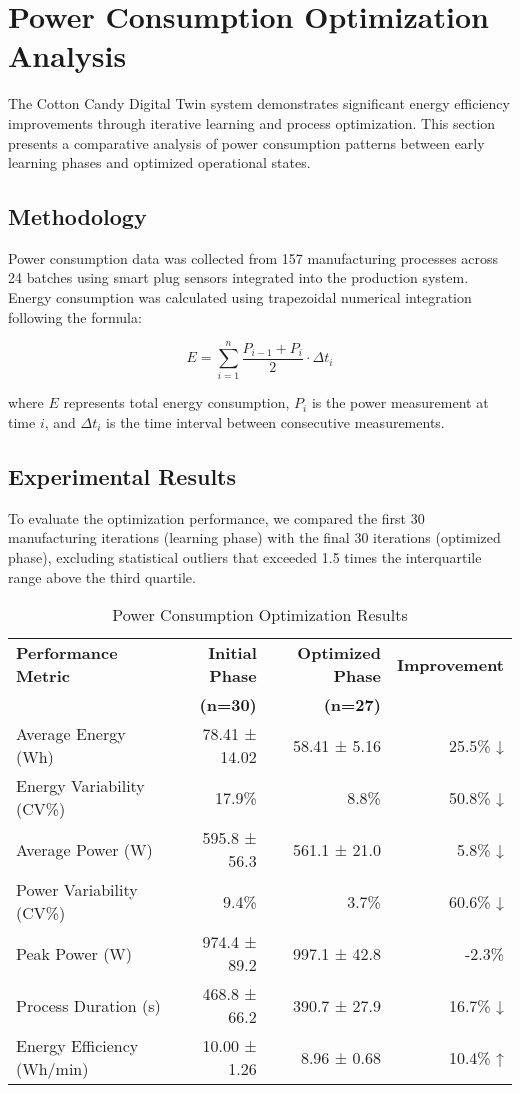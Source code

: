 \section{Power Consumption Optimization Analysis}

The Cotton Candy Digital Twin system demonstrates significant energy efficiency improvements through iterative learning and process optimization. This section presents a comparative analysis of power consumption patterns between early learning phases and optimized operational states.

\subsection{Methodology}

Power consumption data was collected from 157 manufacturing processes across 24 batches using smart plug sensors integrated into the production system. Energy consumption was calculated using trapezoidal numerical integration following the formula:

\begin{equation}
E = \sum_{i=1}^{n} \frac{P_{i-1} + P_i}{2} \cdot \Delta t_i
\end{equation}

where $E$ represents total energy consumption, $P_i$ is the power measurement at time $i$, and $\Delta t_i$ is the time interval between consecutive measurements.

\subsection{Experimental Results}

To evaluate the optimization performance, we compared the first 30 manufacturing iterations (learning phase) with the final 30 iterations (optimized phase), excluding statistical outliers that exceeded 1.5 times the interquartile range above the third quartile.

\begin{table}[htbp]
\centering
\caption{Power Consumption Optimization Results}
\label{tab:power_optimization}
\begin{tabular}{lrrr}
\toprule
\textbf{Performance Metric} & \textbf{Initial Phase} & \textbf{Optimized Phase} & \textbf{Improvement} \\
& \textbf{(n=30)} & \textbf{(n=27)} & \\
\midrule
Average Energy (Wh) & 78.41 ± 14.02 & 58.41 ± 5.16 & 25.5\% ↓ \\
Energy Variability (CV\%) & 17.9\% & 8.8\% & 50.8\% ↓ \\
Average Power (W) & 595.8 ± 56.3 & 561.1 ± 21.0 & 5.8\% ↓ \\
Power Variability (CV\%) & 9.4\% & 3.7\% & 60.6\% ↓ \\
Peak Power (W) & 974.4 ± 89.2 & 997.1 ± 42.8 & -2.3\% \\
Process Duration (s) & 468.8 ± 66.2 & 390.7 ± 27.9 & 16.7\% ↓ \\
Energy Efficiency (Wh/min) & 10.00 ± 1.26 & 8.96 ± 0.68 & 10.4\% ↑ \\
\bottomrule
\end{tabular}
\end{table}

